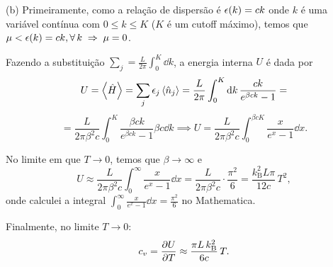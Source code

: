 \documentclass[a4paper,10pt]{article}
\begin{document}
\n

(b) Primeiramente, como a relação de dispersão é $\epsilon(k) = ck$ onde $k$ é uma variável contínua com $0 \leq k \leq K$ ($K$ é um cutoff máximo), temos que $\mu < \epsilon(k) = ck, \forall \, k \; \Rightarrow \; \mu = 0$.

Fazendo a substituição $\sum_{j} = \frac{L}{2\pi} \int_0^K \dd{k}$, a energia interna $U$ é dada por
$$
U = \ev{\hat{H}} = \sum_{j} \eps_j \ev{\nn_j} =
\frac{L}{2\pi} \int_0^K \dd{k} \frac{c k}{e^{\beta ck} - 1} =
$$
$$
= \frac{L}{2\pi \beta^2 c} \int_0^K \frac{\beta c k}{e^{\beta ck} - 1} \beta c \dd{k} \implies
U = \frac{L}{2\pi \beta^2 c} \int_0^{\beta c K} \frac{x}{e^{x} - 1} \dd{x}.
$$

No limite em que $T \to 0$, temos que $\beta \to \infty$ e
$$
U \approx \frac{L}{2\pi \beta^2 c} \int_0^\infty \frac{x}{e^x - 1} \dd{x} =
\frac{L}{2\pi \beta^2 c} \cdot \frac{\pi^2}{6} =
\frac{k_{\text{B}}^2 L \pi}{12 c} \, T^2,
$$
onde calculei a integral $\int_0^\infty \frac{x}{e^x - 1} \dd{x} = \frac{\pi^2}{6}$ no Mathematica.

\n

Finalmente, no limite $T \to 0$:
$$
c_v = \pdv{U}{T} \approx \frac{\pi L \, k_{\text{B}}^2}{6 c} \, T.
$$
\end{document}
